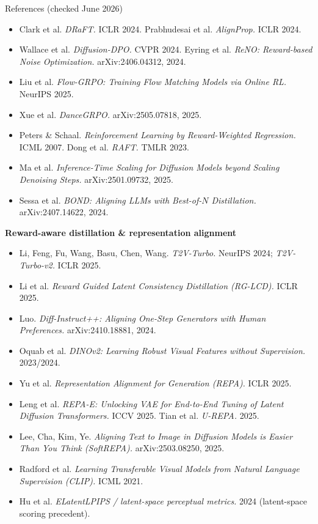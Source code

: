 \documentclass[aspectratio=169,10pt]{beamer}
\begin{document}
\begin{frame}[allowframebreaks]{References (checked June 2026)}
\begin{itemize}
    \item Clark et al. \emph{DRaFT.} ICLR 2024. \quad Prabhudesai et al. \emph{AlignProp.} ICLR 2024.
    \item Wallace et al. \emph{Diffusion-DPO.} CVPR 2024. \quad Eyring et al. \emph{ReNO: Reward-based Noise Optimization.} arXiv:2406.04312, 2024.
    \item Liu et al. \emph{Flow-GRPO: Training Flow Matching Models via Online RL.} NeurIPS 2025.
    \item Xue et al. \emph{DanceGRPO.} arXiv:2505.07818, 2025.
    \item Peters \& Schaal. \emph{Reinforcement Learning by Reward-Weighted Regression.} ICML 2007. \quad Dong et al. \emph{RAFT.} TMLR 2023.
    \item Ma et al. \emph{Inference-Time Scaling for Diffusion Models beyond Scaling Denoising Steps.} arXiv:2501.09732, 2025.
    \item Sessa et al. \emph{BOND: Aligning LLMs with Best-of-$N$ Distillation.} arXiv:2407.14622, 2024.
  \end{itemize}
  \textbf{Reward-aware distillation \& representation alignment}
  \begin{itemize}
    \item Li, Feng, Fu, Wang, Basu, Chen, Wang. \emph{T2V-Turbo.} NeurIPS 2024; \emph{T2V-Turbo-v2.} ICLR 2025.
    \item Li et al. \emph{Reward Guided Latent Consistency Distillation (RG-LCD).} ICLR 2025.
    \item Luo. \emph{Diff-Instruct++: Aligning One-Step Generators with Human Preferences.} arXiv:2410.18881, 2024.
    \item Oquab et al. \emph{DINOv2: Learning Robust Visual Features without Supervision.} 2023/2024.
    \item Yu et al. \emph{Representation Alignment for Generation (REPA).} ICLR 2025.
    \item Leng et al. \emph{REPA-E: Unlocking VAE for End-to-End Tuning of Latent Diffusion Transformers.} ICCV 2025. \quad Tian et al. \emph{U-REPA.} 2025.
    \item Lee, Cha, Kim, Ye. \emph{Aligning Text to Image in Diffusion Models is Easier Than You Think (SoftREPA).} arXiv:2503.08250, 2025.
    \item Radford et al. \emph{Learning Transferable Visual Models from Natural Language Supervision (CLIP).} ICML 2021.
    \item Hu et al. \emph{ELatentLPIPS / latent-space perceptual metrics.} 2024 (latent-space scoring precedent).
  \end{itemize}
\end{frame}
\end{document}
